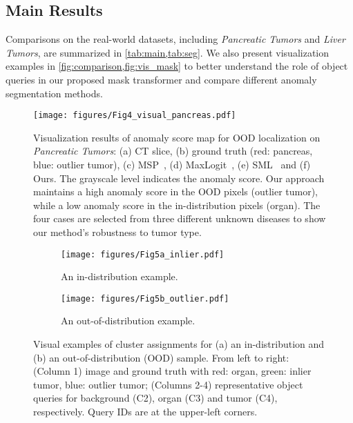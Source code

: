 \documentclass[10pt,twocolumn,letterpaper]{article}
\begin{document}
\subsection{Main Results}
\label{sec:results}
Comparisons on the real-world datasets, including \textit{Pancreatic Tumors} and \textit{Liver Tumors}, are summarized in \cref{tab:main,tab:seg}. We also present visualization examples in \cref{fig:comparison,fig:vis_mask} to better understand the role of object queries in our proposed mask transformer and compare different anomaly segmentation methods. 

\begin{figure*}[t]
  \centering
   \texttt{[image: figures/Fig4\_visual\_pancreas.pdf]}
   \caption{Visualization results of anomaly score map for OOD localization on \textit{Pancreatic Tumors}: (a) CT slice, (b) ground truth (red: pancreas, blue: outlier tumor), (c) MSP~\cite{hendrycks2016baseline}, (d) MaxLogit~\cite{hendrycks2019scaling}, (e) SML~\cite{jung2021standardized} and (f) Ours. The grayscale level indicates the anomaly score. Our approach maintains a high anomaly score in the OOD pixels (outlier tumor), while a low anomaly score in the in-distribution pixels (organ). The four cases are selected from three different unknown diseases to show our method's robustness to tumor type.}
   \label{fig:comparison}
\end{figure*}

\begin{figure}[ht]
  \centering
  
  \begin{subfigure}[a]{0.42\textwidth}
         \centering
         \texttt{[image: figures/Fig5a\_inlier.pdf]}
         \caption{An in-distribution example.}
         \label{fig:in-lier}
     \end{subfigure}
     
\begin{subfigure}[b]{0.42\textwidth}
         \centering
         \texttt{[image: figures/Fig5b\_outlier.pdf]}
         \caption{An out-of-distribution example.}
         \label{fig:outlier}
     \end{subfigure}
\caption{Visual examples of cluster assignments for (a) an in-distribution and (b) an out-of-distribution (OOD) sample. From left to right: (Column 1) image and ground truth with red: organ, green: inlier tumor, blue: outlier tumor; (Columns 2-4) representative object queries for background (C2), organ (C3) and tumor (C4), respectively. Query IDs are at the upper-left corners.}
  \label{fig:vis_mask} 
\end{figure} 
\end{document}

